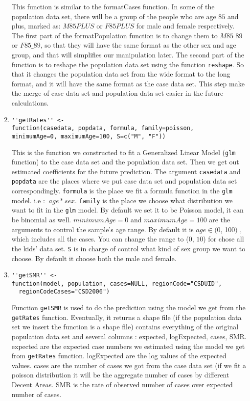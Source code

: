 \documentclass{article}
\begin{document}
\begin{enumerate}
This function is similar to the formatCases function.
In some of the population data set, there will be a group of the people who are
age $85$ and plus, marked as: \small $M85PLUS$ or $F85PLUS$ \large for male and female respectively.
The first part of the formatPopulation function is to change them to \small $M85\_89$ or $F85\_89$,
\large so that they will have the same format as the other sex and age group, and that will
simplifies our manipulation later.
The second part of the function is to reshape the population data set using the function
\texttt{reshape}. So that it changes the population data set from the wide format
to the long format, and it will have the same format as the case data set. This step make
the merge of case data set and population data set easier in the future calculations.



\item 
\begin{verbatim}
''getRates'' <-
function(casedata, popdata, formula, family=poisson,
minimumAge=0, maximumAge=100, S=c("M", "F"))
\end{verbatim}

This is the function we constructed to fit a Generalized Linear Model (\texttt{glm} function) to
the case data set and the population data set. Then we get out estimated coefficients for the future
prediction.
The argument \texttt{casedata} and \texttt{popdata} are the places where we put case data set
and population data set correspondingly. \texttt{formula} is the place we fit a formula function
in the \texttt{glm} model. i.e : $~age*sex $. \texttt{family} is the place we
choose what distribution we want to fit in the \texttt{glm} model. By default we set it to be Poisson model, it
can be binomial as well.
\texttt{$minimumAge=0$} and \texttt{$maximumAge=100$} are the arguments to control the sample's age range. 
By default it is $age \in ($0, 100$)$ , which includes all the cases. You can change the range to ($0$, $10$) 
for chose all the kids' data set.  \texttt{S} is in charge of control what kind of sex group we want to choose. 
By default it choose both the male and female.


\item 
\begin{verbatim}
''getSMR'' <-
function(model, population, cases=NULL, regionCode="CSDUID",
  regionCodeCases="CSD2006")
\end{verbatim}

Function \texttt{getSMR} is used to do the prediction using the model we get from the
\texttt{getRates} function. Eventually, it returns a shape file (if the population data set
we insert the function is a shape file) contains everything of the original population
data set and several columns : expected, logExpected, cases, SMR. expected are the expected
case numbers we estimated using the model we get from \texttt{getRates} function. logExpected
are the log values of the expected values. cases are the number of cases we got from the
case data set (if we fit a poisson distribution it will be the aggregate number of cases by
different Decent Areas. SMR is the rate of observed number of cases over expected number of cases.


\end{enumerate}
\end{document}
